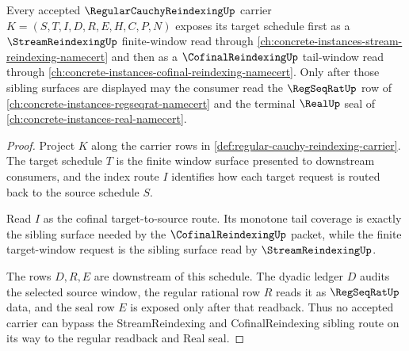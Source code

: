 \begin{theorem}
\label{thm:regular-cauchy-reindexing-cofinal-stream-factorization}
Every accepted $\RegularCauchyReindexingUp$ carrier $K=(S,T,I,D,R,E,H,C,P,N)$ exposes its target schedule first as a $\StreamReindexingUp$ finite-window read through \autoref{ch:concrete-instances-stream-reindexing-namecert} and then as a $\CofinalReindexingUp$ tail-window read through \autoref{ch:concrete-instances-cofinal-reindexing-namecert}. Only after those sibling surfaces are displayed may the consumer read the $\RegSeqRatUp$ row of \autoref{ch:concrete-instances-regseqrat-namecert} and the terminal $\RealUp$ seal of \autoref{ch:concrete-instances-real-namecert}.
\end{theorem}
\begin{proof}
Project $K$ along the carrier rows in \autoref{def:regular-cauchy-reindexing-carrier}. The target schedule $T$ is the finite window surface presented to downstream consumers, and the index route $I$ identifies how each target request is routed back to the source schedule $S$.

Read $I$ as the cofinal target-to-source route. Its monotone tail coverage is exactly the sibling surface needed by the $\CofinalReindexingUp$ packet, while the finite target-window request is the sibling surface read by $\StreamReindexingUp$.

The rows $D,R,E$ are downstream of this schedule. The dyadic ledger $D$ audits the selected source window, the regular rational row $R$ reads it as $\RegSeqRatUp$ data, and the seal row $E$ is exposed only after that readback. Thus no accepted carrier can bypass the StreamReindexing and CofinalReindexing sibling route on its way to the regular readback and Real seal.
\end{proof}


\begin{closurestatus}{\RegularCauchyReindexingUp}
  \theoryclosure{\seedClosure}
  \formalstatus{\unformalizedV}
\end{closurestatus}
